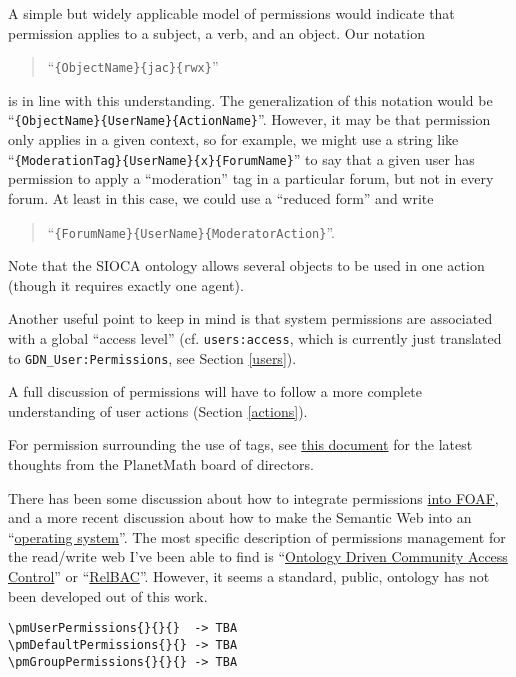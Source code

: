 \documentclass{article}
\begin{document}
A simple but widely applicable model of permissions would
indicate that permission applies to a subject, a verb, and
an object.  Our notation \begin{quotation}``\verb|{ObjectName}{jac}{rwx}|''
\end{quotation}
is in line with this understanding.  The generalization of
this notation would be
``\verb|{ObjectName}{UserName}{ActionName}|''.  However,
it may be that permission only applies in a given context,
so for example, we might use a string like
``\verb|{ModerationTag}{UserName}{x}{ForumName}|'' to say
that a given user has permission to apply a ``moderation''
tag in a particular forum, but not in every forum.  At
least in this case, we could use a ``reduced form''
and write \begin{quotation}
  ``\verb|{ForumName}{UserName}{ModeratorAction}|''.
\end{quotation}
Note that the SIOCA ontology allows several objects to be
used in one action (though it requires exactly one agent).

Another useful point to keep in mind is that system
permissions are associated with a global ``access level''
(cf. \verb|users:access|, which is currently just
translated to \verb|GDN_User:Permissions|, see Section
\ref{users}).

A full discussion of permissions will have to follow a
more complete understanding of user actions (Section
\ref{actions}).

For permission surrounding the use of tags, see
\href{http://trac.mathweb.org/planetary/export/HEAD/contrib/planetmath-tags.pdf}{this
  document} for the latest thoughts from the PlanetMath
board of directors.

There has been some discussion about how to integrate
permissions
\href{http://www.w3.org/2001/sw/Europe/events/foaf-galway/papers/fp/technical_and_privacy_challenges/}{into
  FOAF}, and a more recent discussion about how to make
the Semantic Web into an
``\href{http://www.freesoftwaremagazine.com/articles/semantic_web_operating_system_users_and_permissions}{operating
  system}''.  The most specific description of permissions
management for the read/write web I've been able to find
is
``\href{http://disi.unitn.it/security/spot.pdf}{Ontology
  Driven Community Access Control}'' or
``\href{http://eprints.biblio.unitn.it/archive/00001527/01/080.pdf}{RelBAC}''.
However, it seems a standard, public, ontology has not
been developed out of this work.

\begin{verbatim}
\pmUserPermissions{}{}{}  -> TBA
\pmDefaultPermissions{}{} -> TBA
\pmGroupPermissions{}{}{} -> TBA
\end{verbatim}
\end{document}
